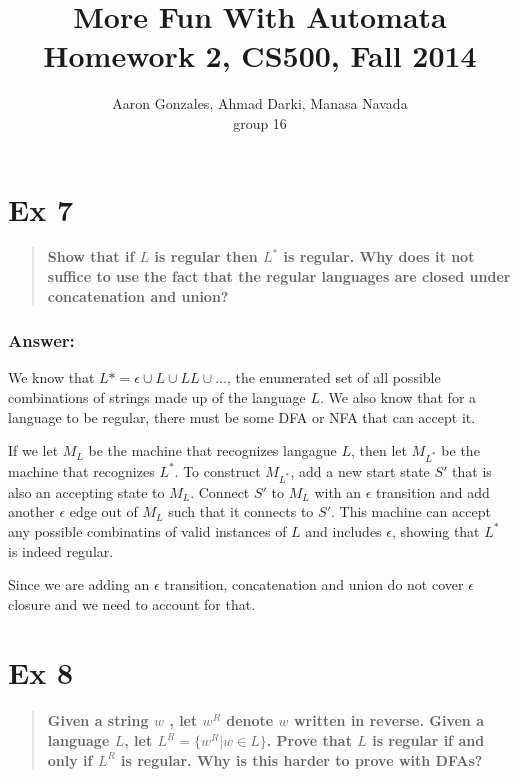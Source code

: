 \documentclass[titlepage]{article}\usepackage[]{graphicx}\usepackage[]{color}
\begin{document}
\title{More Fun With Automata \\ Homework 2, CS500, Fall 2014}
\author{Aaron Gonzales, Ahmad Darki, Manasa Navada \\ group 16}
\maketitle


\section*{Ex 7}
\begin{quote}
  \textbf{Show that if $L$ is regular then $L^*$ is regular. Why does it not suffice
  to use the fact that the regular languages are closed under concatenation and
  union?}
\end{quote}
\subsubsection*{Answer:}
We know that $L* = \epsilon \cup L \cup LL \cup \dots$, the enumerated set of
all possible combinations of strings made up of the language $L$. We also know
that for a language to be regular, there must be some DFA or NFA that can
accept it. 

If we let $M_L$ be the machine that recognizes langague $L$, then let $M_{L^*}$
be the machine that recognizes $L^*$. To construct $M_{L^*}$, add a new start
state $S'$ that is also an accepting state to $M_L$. Connect $S'$ to $M_L$ with
an $\epsilon$ transition and add another $\epsilon$ edge out of $M_L$ such that
it connects to $S'$. This machine can accept any possible combinatins of valid
instances of $L$ and includes $\epsilon$, showing that $L^*$ is indeed regular. 

Since we are adding an $\epsilon$ transition, concatenation and union do not
cover $\epsilon$ closure and we need to account for that.



\section*{Ex 8}
\begin{quote}
  \textbf{Given a string $w$ , let $w^R$ denote $w$ written in reverse.
    Given a language $L$, let $L^R = \{w^R | w \in L \}$. Prove that $L$ is regular if and
    only if $L^R$ is regular. Why is this harder to prove with DFAs?}
\end{quote}
\end{document}
